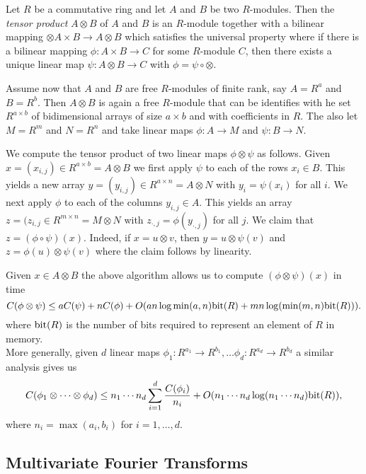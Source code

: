 Let $R$ be a commutative ring and let $A$ and $B$ be two $R$-modules. Then the \emph{tensor product} $A \otimes B$ of $A$ and $B$ is an $R$-module together with a bilinear mapping $\otimes A \times B \to A \otimes B$ which satisfies the universal property where if there is a bilinear mapping $\phi: A \times B \to C$ for some $R$-module $C$, then there exists a unique linear map $\psi: A \otimes B \to C$ with $\phi = \psi \circ \otimes$.

Assume now that $A$ and $B$ are free $R$-modules of finite rank, say $A = R^a$ and $B = R^b$. Then $A \otimes B$ is again a free $R$-module that can be identifies with he set $R^{a \times b}$ of bidimensional arrays of size $a \times b$ and with coefficients in $R$. The also let $M = R^m$ and $N = R^n$ and take linear maps $\phi: A \to M$ and $\psi : B \to N$.

We compute the tensor product of two linear maps $\phi \otimes \psi$ as follows. Given $x = (x_{i,j}) \in R^{a \times b} = A \otimes B$ we first apply $\psi$ to each of the rows $x_i \in B$. This yields a new array $y = (y_{i, j}) \in R^{a \times n} = A \otimes N$ with $y_i = \psi(x_i)$ for all $i$. We next apply $\phi$ to each of the columns $y_{i, j} \in A$. This yields an array $z = (z_{i, j} \in R^{m \times n} = M \otimes N$ with $z_{\cdot , j} = \phi(y_{\cdot, j})$ for all $j$. We claim that $z = (\phi \circ \psi)(x)$. Indeed, if $x = u \otimes v$, then $y = u \otimes \psi(v)$ and $z = \phi(u) \otimes \psi(v)$ where the claim follows by linearity.

Given $x \in A \otimes B$ the above algorithm allows us to compute $(\phi \otimes \psi) (x)$ in time
\[
    C(\phi \otimes \psi) \leq aC(\psi) + nC(\phi) + O(a n \log \min(a, n) \textrm{bit}(R) + m n \log( \min (m, n)\textrm{bit}(R))).
\]
where $\textrm{bit}(R)$ is the number of bits required to represent an element of $R$ in memory.\\
More generally, given $d$ linear maps $\phi_1: R^{a_1} \to R^{b_1}, \ldots \phi_d: R^{a_d} \to R^{b_d}$ a similar analysis gives us
\[
    C(\phi_1 \otimes \cdots \otimes \phi_d) \leq n_1\cdots n_d \sum^d_{i = 1} \frac{C(\phi_i)}{n_i} + O(n_1\cdots n_d \log (n_1 \cdots n_d) \textrm{bit}(R)),
\]
where $n_i = \max(a_i, b_i)$ for $i = 1, \ldots, d$.


\subsection{Multivariate Fourier Transforms}%
\label{sub:multivariate_fourier_transforms}

